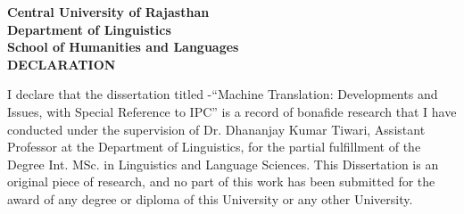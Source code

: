 \clearpage
\begin{center}
\textbf{
    Central University of Rajasthan\\
    Department of Linguistics\\
    School of Humanities and Languages\\
    }
    \vspace{2cm}
\textbf{\large DECLARATION}
\end{center}

\noindent


\vspace{0.5cm}
\onehalfspacing
I declare that the dissertation titled -``Machine Translation: Developments and Issues, with Special Reference to IPC” is a record of bonafide research that I have conducted under the supervision of Dr. Dhananjay Kumar Tiwari, Assistant Professor at the Department of Linguistics, for the partial fulfillment of the Degree Int. MSc. in Linguistics and Language Sciences. This Dissertation is an original piece of research, and no part of this work has been submitted for the award of any degree or diploma of this University or any other University.

\vspace{5cm}

\doublespacing

\clearpage